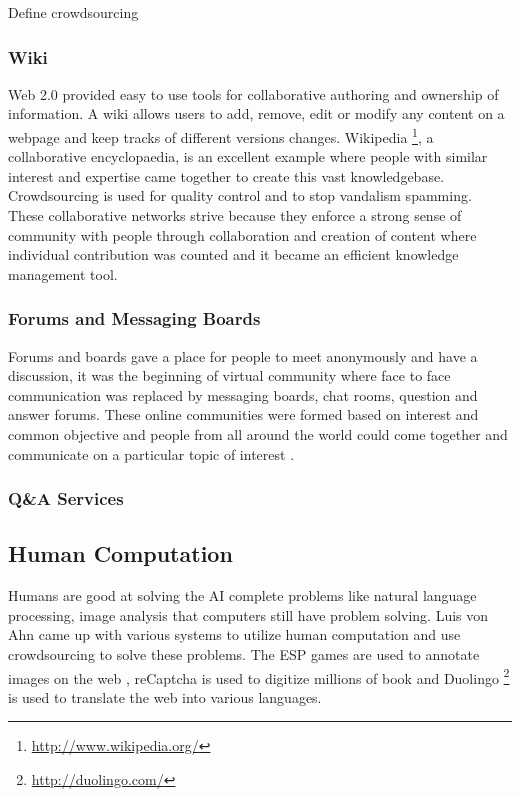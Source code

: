 Define crowdsourcing

\subsubsection{Wiki}

Web 2.0 provided easy to use tools for collaborative authoring and ownership of information. A wiki allows users to add, remove, edit or modify any content on a webpage and keep tracks of different versions changes. Wikipedia \footnote{\url{http://www.wikipedia.org/}}, a collaborative encyclopaedia, is an excellent example where people with similar interest and expertise came together to create this vast knowledgebase. Crowdsourcing is used for quality control and to stop vandalism spamming. These collaborative networks strive because they enforce a strong sense of community with people through collaboration and creation of content where individual contribution was counted and it became an efficient knowledge management tool.


\subsubsection{Forums and Messaging Boards}

Forums and boards gave a place for people to meet anonymously and have a discussion, it was the beginning of virtual community where face to face communication was replaced by messaging boards, chat rooms, question and answer forums. These online communities were formed based on interest and common objective and people from all around the world could come together and communicate on a particular topic of interest \cite{adamic2008knowledge}.


\subsubsection{Q\&A Services}


\subsection{Human Computation}

Humans are good at solving the AI complete problems like natural language processing, image analysis that computers still have problem solving. Luis von Ahn came up with various systems to utilize human computation and use crowdsourcing to solve these problems. The ESP games \cite{vonAhn2004} are used to annotate images on the web \cite{von2006games}, reCaptcha \cite{vonAhn2003} is used to digitize millions of book and Duolingo \footnote{\url{http://duolingo.com/}} is used to translate the web into various languages.

